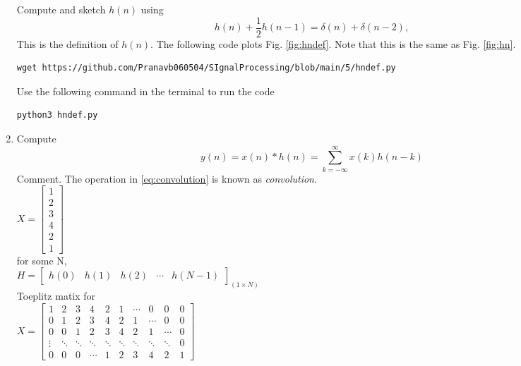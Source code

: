 \documentclass[journal,12pt,twocolumn]{IEEEtran}
\renewcommand\thesection{\arabic{section}}
\begin{document}
\begin{enumerate}[label=\thesection.\arabic*]
Compute and sketch $h(n)$ using 
\begin{equation}
\label{eq:iir_filter_h}
h(n) + \frac{1}{2}h(n-1) = \delta(n) + \delta(n-2), 
\end{equation}
%
This is the definition of $h(n)$.
\solution The following code plots Fig. \ref{fig:hndef}. Note that this is the same as Fig. 
\ref{fig:hn}. 
%
\begin{lstlisting}
wget https://github.com/Pranavb060504/SIgnalProcessing/blob/main/5/hndef.py
\end{lstlisting}
Use the following command in the terminal to run the code
\begin{lstlisting}
python3 hndef.py
\end{lstlisting}
%
\item Compute 
%
\begin{equation}
\label{eq:convolution}
y(n) = x(n)*h(n) = \sum_{k=-\infty}^{\infty}x(k)h(n-k)
\end{equation}
%
Comment. The operation in \eqref{eq:convolution} is known as
{\em convolution}.
%
\\
\solution
 $X=\begin{bmatrix}
1 \\2 \\3 \\4 \\2 \\1
\end{bmatrix} $\\
for some N,\\
$H=\begin{bmatrix}
h(0) & h(1) & h(2) & \cdots & h(N-1)
\end{bmatrix}_{(1 \times N)}$\\
Toeplitz matix for \\
$X=\begin{bmatrix}
1 & 2 & 3 & 4 & 2 & 1 & \cdots & 0 & 0& 0\\
0 & 1 & 2 & 3 & 4 & 2 & 1 & \cdots &0 & 0\\
0 & 0 & 1 & 2 & 3 & 4 & 2 & 1 & \cdots & 0\\
\vdots & \ddots & \ddots & \ddots & \ddots & \ddots & \ddots  & \ddots  & \ddots & 0\\
0 & 0 & 0 &\cdots & 1 & 2 & 3 & 4 & 2 & 1
\end{bmatrix}$

\end{enumerate}
\end{document}
